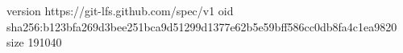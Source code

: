 version https://git-lfs.github.com/spec/v1
oid sha256:b123bfa269d3bee251bca9d51299d1377e62b5e59bff586cc0db8fa4c1ea9820
size 191040
